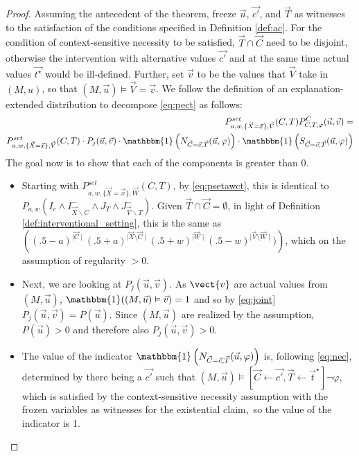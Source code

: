 \documentclass{article}
\begin{document}
\begin{proof}  Assuming the antecedent of the theorem, freeze $\vec{u}$, $\vec{c'}$, and $\vec{T}$ as witnesses to the satisfaction of the conditions specified in Definition \ref{def:ac}. For the condition of context-sensitive necessity to be satisfied, $\vec{T} \cap \vec{C}$ need to be disjoint, otherwise the intervention with alternative values $\vec{c'}$ and at the same time actual values $\vec{t^\star}$ would be ill-defined. Further, set $\vec{v}$ to be the values that $\vec{V}$ take in  $(M,u)$, so that $(M, \vec{u}) \models \vec{V} = \vec{v}$.  
We follow the definition of an explanation-extended distribution to decompose \eqref{eq:pect} as follows:
\begin{align}
    P^{\mathit{set}}_{a,w, \{\vec{X}=\vec {x}\}, \vec{V}}(C,T)  P^C_{C, T, \varphi} (\vec{u}, \vec{v}) = \\
      P^{\mathit{set}}_{a,w, \{\vec{X}=\vec {x}\}, \vec{V}}(C,T) \cdot P_j(\vec{u}, \vec{v}) \cdot \mathbbm{1}\left(N_{\vec{C} = \vec{c}, \vec{T}}(\vec{u}, \varphi)\right) \cdot \mathbbm{1}\left(S_{\vec{C} = \vec{c}, \vec{T}}(\vec{u}, \varphi)\right) \label{eq:decomposition}
\end{align}
\noindent The goal now is to show that each of the components is greater than 0.

\begin{itemize}
\item Starting with $P^{\mathit{set}}_{a,w, \{\vec{X}=\vec {x}\}, \vec{W}}(C,T)$, by \eqref{eq:psetawct}, this is identical to \linebreak  $P_{a, w}\left(I_c \wedge I^-_{\vec{X} \backslash C}  \wedge  J_T  \wedge J^-_{\vec{V} \backslash T} \right)$. Given  $\vec{T} \cap \vec{C} = \emptyset$, in light of Definition \ref{def:interventional_setting}, this is the same as 
$\left( (.5-a)^{\mid \vec{C}\mid}   (.5+a)^{\mid \vec{X}\setminus \vec{C}\mid} (.5+w)^{\mid \vec{W}\mid} (.5-w)^{\mid \vec{V}\setminus \vec{W}\mid} )  \right)$, which on the assumption of regularity $>0$.

\item Next, we are looking at $P_j(\vec{u}, \vec{v})$. As $\vect{v}$ are actual values from $(M,\vec{u})$,  $\mathbbm{1}((M, \vec{u}) \vDash \vec{v})=1$ and so by \eqref{eq:joint}  $P_j(\vec{u}, \vec{v}) = P(\vec{u})$. Since $(M, \vec{u})$ are realized by the assumption, $P(\vec{u}) > 0$ and therefore also $P_j(\vec{u}, \vec{v})>0$. 

\item The value of the indicator $\mathbbm{1}\left(N_{\vec{C} = \vec{c}, \vec{T}}(\vec{u}, \varphi)\right)$ is, following \eqref{eq:nec}, determined by there being a $\vec{c'}$ such that 
$(M, \vec{u}) \vDash [\vec{C} \leftarrow \vec{c'}, \vec{T} \leftarrow \vec{t}^\star]\neg \varphi$, which is satisfied by the context-sensitive necessity assumption with the frozen variables as witnesses for the existential claim, so the value of the indicator is 1.


\end{itemize}
\end{proof}
\end{document}
